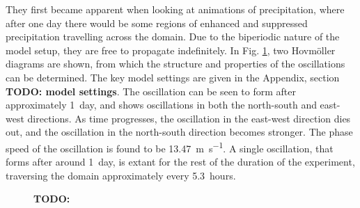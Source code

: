 \documentclass[11pt,a4paper]{article}
\newcommand\todo[1]{\textbf{TODO: #1}}
\begin{document}
They first became apparent when looking at animations of precipitation, where after one day there would be some regions of enhanced and suppressed precipitation travelling across the domain. Due to the biperiodic nature of the model setup, they are free to propagate indefinitely. In Fig. \ref{fig:hovmollers}, two Hovm{\"o}ller diagrams are shown, from which the structure and properties of the oscillations can be determined. The key model settings are given in the Appendix, section \todo{model settings}. The oscillation can be seen to form after approximately \SI{1}{day}, and shows oscillations in both the north-south and east-west directions. As time progresses, the oscillation in the east-west direction dies out, and the oscillation in the north-south direction becomes stronger. The phase speed of the oscillation is found to be \SI{13.47}{m.s^{-1}}. A single oscillation, that forms after around \SI{1}{day}, is extant for the rest of the duration of the experiment, traversing the domain approximately every \SI{5.3}{hours}.

\begin{figure}[hbt!]%
    \centering
    \qquad
    \caption{\todo{}}%
    \label{fig:hovmollers}%
\end{figure}
\end{document}

